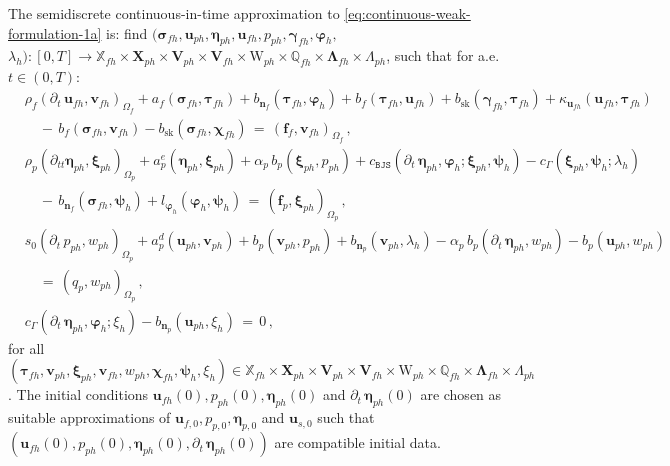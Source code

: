 \documentclass[11pt]{article}
\numberwithin{equation}{section}
\newcommand{\bgamma}{{\boldsymbol\gamma}}
\newcommand{\bLambda}{{\boldsymbol\Lambda}}
\newcommand{\bbeta}{{\boldsymbol\eta}}
\newcommand{\bsi}{{\boldsymbol\sigma}}
\newcommand{\bvarphi}{{\boldsymbol\varphi}}
\newcommand{\bpsi}{{\boldsymbol\psi}}
\newcommand{\btau}{{\boldsymbol\tau}}
\newcommand{\bchi}{{\boldsymbol\chi}}
\newcommand{\bxi}{{\boldsymbol\xi}}
\newcommand{\bv}{{\mathbf{v}}}
\newcommand{\f}{\mathbf{f}}
\newcommand{\bu}{\mathbf{u}}
\newcommand{\bn}{{\mathbf{n}}}
\newcommand{\0}{{\mathbf{0}}}
\def\bX{\mathbf{X}}
\def\bV{\mathbf{V}}
\newcommand\bbQ{\mathbb{Q}}
\newcommand\bbX{\mathbb{X}}
\def\W{\mathrm{W}}
\def\BJS{\mathtt{BJS}}
\def\sk{\mathrm{sk}}
\numberwithin{equation}{section}
\begin{document}
The semidiscrete continuous-in-time approximation to \eqref{eq:continuous-weak-formulation-1a} is: find $(\bsi_{fh},\bu_{ph}, \bbeta_{ph}, \bu_{fh}, p_{ph}, \bgamma_{fh}, \bvarphi_{h},$ $\lambda_{h}) : [0,T]\to \bbX_{fh}\times \bX_{ph}\times \bV_{ph}\times \bV_{fh}\times \W_{ph}\times \bbQ_{fh}\times \bLambda_{fh}\times \Lambda_{ph}$, such that for a.e. $t\in (0,T)$:
\begin{align}
& \rho_f (\partial_t\,\bu_{fh},\bv_{fh})_{\Omega_f}+ a_f(\bsi_{fh},\btau_{fh})+b_{\bn_f}(\btau_{fh},\bvarphi_{h}) + b_f(\btau_{fh},\bu_{fh}) + b_\sk(\bgamma_{fh},\btau_{fh})+\kappa_{\bu_{fh}}(\bu_{fh}, \btau_{fh}) \nonumber \\ 
&\quad -\, b_f(\bsi_{fh},\bv_{fh}) - b_\sk(\bsi_{fh},\bchi_{fh})  \, = \, (\f_{f},\bv_{fh})_{\Omega_f}\,, \nonumber \\ 
& \rho_p(\partial_{tt}\bbeta_{ph},\bxi_{ph})_{\Omega_p} + a^e_p(\bbeta_{ph},\bxi_{ph})+ \alpha_p\,b_p(\bxi_{ph},p_{ph}) +c_{\BJS}(\partial_t\,\bbeta_{ph}, \bvarphi_{h};\bxi_{ph}, \bpsi_{h})- c_{\Gamma}(\bxi_{ph},\bpsi_{h};\lambda_{h}) \nonumber \\ 
&\quad -\,b_{\bn_f}(\bsi_{fh},\bpsi_{h})+l_{\bvarphi_{h}}(\bvarphi_{h},\bpsi_{h}) \, = \,(\f_{p},\bxi_{ph})_{\Omega_p}\,, \nonumber \\ 
& s_0 (\partial_t\,p_{ph},w_{ph})_{\Omega_p} +a^d_p(\bu_{ph},\bv_{ph}) +b_p(\bv_{ph},p_{ph})+b_{\bn_p}(\bv_{ph},\lambda_{h})  - \alpha_p\,b_p(\partial_t\,\bbeta_{ph},w_{ph})- b_p(\bu_{ph},w_{ph}) \nonumber \\ 
&\quad = \,(q_{p},w_{ph})_{\Omega_p}\,, \nonumber \\ 
& c_{\Gamma}(\partial_t\,\bbeta_{ph},\bvarphi_{h};\xi_{h})-b_{\bn_p}(\bu_{ph},\xi_{h})\, = \,0\,,  
\label{eq:NS-Biot-semiformulation-1}
\end{align}
for all $(\btau_{fh}, \bv_{ph}, \bxi_{ph}, \bv_{fh}, w_{ph}, \bchi_{fh}, \bpsi_{h}, \xi_{h})\in \bbX_{fh}\times \bX_{ph}\times \bV_{ph}\times \bV_{fh}\times \W_{ph}\times \bbQ_{fh}\times \bLambda_{fh}\times \Lambda_{ph}$. The initial conditions $\bu_{fh}(0),p_{ph}(0),\bbeta_{ph}(0)$ and $\partial_t\,\bbeta_{ph}(0)$ are chosen as suitable approximations of $\bu_{f,0},p_{p,0},\bbeta_{p,0}$ and $\bu_{s,0}$ such that $(\bu_{fh}(0),p_{ph}(0),\bbeta_{ph}(0),\partial_t\,\bbeta_{ph}(0))$ are compatible initial data. 
\end{document}
